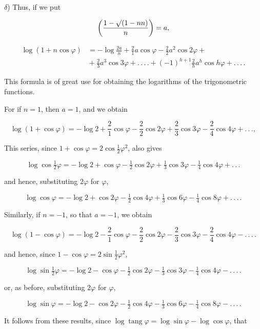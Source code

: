 $\delta$) Thus, if we put

\[
\left(\frac{1-\mathord{\surd}(1-nn)}{n}\right) = a,
\]

\[
\begin{aligned}
\log(1+n\cos\varphi) & = -\log\frac{2a}{n} + \frac{2}{1}a\cos\varphi - \frac{2}{2}a^2\cos2\varphi +\\
&{} + \frac{2}{3}a^3\cos3\varphi + .\,.\,.\,. + (-1)^{h+1}\frac{2}{h}a^h\cos h\varphi + .\,.\,.\,.
\end{aligned}
\]

 This formula is of great use for obtaining the logarithms of the
trigonometric functions.

For if $n=1$, then $a=1$, and we obtain

\[
\log(1+\cos\varphi) = -\log 2 + \frac{2}{1}\cos\varphi - \frac{2}{2}\cos2\varphi + \frac{2}{3}\cos3\varphi - \frac{2}{4}\cos4\varphi + .\,.\,.,
\]

\noindent This series, since $1+\cos\varphi = 2\cos\frac{1}{2}\varphi^2$,
also gives

\[
\log\cos\tfrac{1}{2}\varphi = -\log 2 + \cos\varphi - \tfrac{1}{2}\cos2\varphi + \tfrac{1}{3}\cos3\varphi - \tfrac{1}{4}\cos4\varphi + .\,.\,.
\]

\noindent and hence, substituting $2\varphi$ for $\varphi$,

\[
\log\cos\varphi = -\log 2 + \cos2\varphi - \tfrac{1}{2}\cos4\varphi + \tfrac{1}{3}\cos6\varphi - \tfrac{1}{4}\cos8\varphi + .\,.\,.\,.
\]

\noindent Similarly, if $n=-1$, so that $a=-1$, we obtain

\[
\log(1-\cos\varphi) = -\log 2 - \frac{2}{1}\cos\varphi - \frac{2}{2}\cos2\varphi - \frac{2}{3}\cos3\varphi - \frac{2}{4}\cos4\varphi - .\,.\,.\,.
\]

\noindent and hence, since $1-\cos\varphi = 2\sin\tfrac{1}{2}\varphi^2$,

\[
\log\sin\tfrac{1}{2}\varphi = -\log 2 - \cos\varphi - \tfrac{1}{2}\cos2\varphi - \tfrac{1}{3}\cos3\varphi - \tfrac{1}{4}\cos4\varphi - .\,.\,.\,.
\]

\noindent or, as before, substituting $2\varphi$ for $\varphi$,

\[
\log\sin\varphi = -\log 2 - \cos2\varphi - \tfrac{1}{2}\cos4\varphi - \tfrac{1}{3}\cos6\varphi - \tfrac{1}{4}\cos8\varphi - .\,.\,.\,.
\]

\noindent It follows from these results, since $\log\operatorname{tang}\varphi = \log\sin\varphi - \log\cos\varphi$, that

